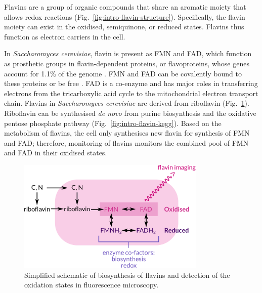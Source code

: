 Flavins are a group of organic compounds that share an aromatic moiety that allows redox reactions (Fig.\ \ref{fig:intro-flavin-structure}).
Specifically, the flavin moiety can exist in the oxidised, semiquinone, or reduced states.
Flavins thus function as electron carriers in the cell.

In \textit{Saccharomyces cerevisiae}, flavin is present as FMN and FAD, which function as prosthetic groups in flavin-dependent proteins, or flavoproteins, whose genes account for 1.1\% of the genome \parencite{gudipatiFlavoproteomeYeastSaccharomyces2014}.
FMN and FAD can be covalently bound to these proteins or be free \parencite{mewiesCovalentAttachmentFlavin1998}.
FAD is a co-enzyme and has major roles in transferring electrons from the tricarboxylic acid cycle to the mitochondrial electron transport chain.
Flavins in \textit{Saccharomyces cerevisiae} are derived from riboflavin (Fig.\ \ref{fig:intro-flavin-schematic}).
Riboflavin can be synthesised \textit{de novo} from purine biosynthesis and the oxidative pentose phosphate pathway (Fig.\ \ref{fig:intro-flavin-kegg}).
Based on the metabolism of flavins, the cell only synthesises new flavin for synthesis of FMN and FAD\@; therefore, monitoring of flavins monitors the combined pool of FMN and FAD in their oxidised states.

\begin{figure}
  \centering
  \includegraphics[width=0.8\textwidth]{flavin-cell-schematic}
  \caption[
    Simplified schematic of biosynthesis of flavins
  ]{
    Simplified schematic of biosynthesis of flavins and detection of the oxidation states in fluorescence microscopy.
    }
  \label{fig:intro-flavin-schematic}
\end{figure}

